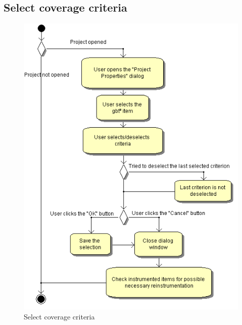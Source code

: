\subsection{Select coverage criteria}
\begin{figure}[htb]
 \centering
 \includegraphics[height=0.7\textheight]{images/Activities/select_coverage_criteria.png}
 \caption{Select coverage criteria}
 \label{ac_fg:select_coverage}
\end{figure}

\clearpage
